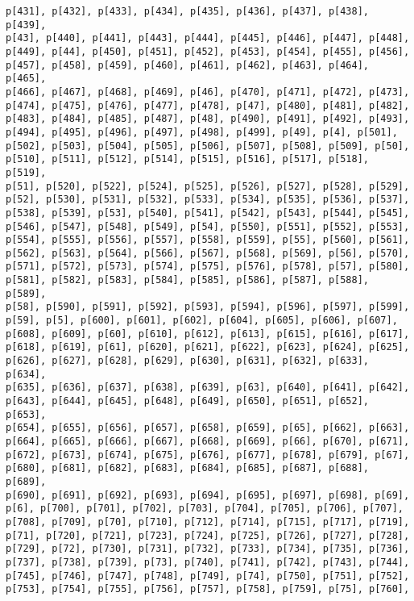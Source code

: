 \documentclass[
  letterpaper,
  DIV=11,
  numbers=noendperiod]{scrartcl}
\begin{document}
\begin{verbatim}
p[431], p[432], p[433], p[434], p[435], p[436], p[437], p[438], p[439],
p[43], p[440], p[441], p[443], p[444], p[445], p[446], p[447], p[448],
p[449], p[44], p[450], p[451], p[452], p[453], p[454], p[455], p[456],
p[457], p[458], p[459], p[460], p[461], p[462], p[463], p[464], p[465],
p[466], p[467], p[468], p[469], p[46], p[470], p[471], p[472], p[473],
p[474], p[475], p[476], p[477], p[478], p[47], p[480], p[481], p[482],
p[483], p[484], p[485], p[487], p[48], p[490], p[491], p[492], p[493],
p[494], p[495], p[496], p[497], p[498], p[499], p[49], p[4], p[501],
p[502], p[503], p[504], p[505], p[506], p[507], p[508], p[509], p[50],
p[510], p[511], p[512], p[514], p[515], p[516], p[517], p[518], p[519],
p[51], p[520], p[522], p[524], p[525], p[526], p[527], p[528], p[529],
p[52], p[530], p[531], p[532], p[533], p[534], p[535], p[536], p[537],
p[538], p[539], p[53], p[540], p[541], p[542], p[543], p[544], p[545],
p[546], p[547], p[548], p[549], p[54], p[550], p[551], p[552], p[553],
p[554], p[555], p[556], p[557], p[558], p[559], p[55], p[560], p[561],
p[562], p[563], p[564], p[566], p[567], p[568], p[569], p[56], p[570],
p[571], p[572], p[573], p[574], p[575], p[576], p[578], p[57], p[580],
p[581], p[582], p[583], p[584], p[585], p[586], p[587], p[588], p[589],
p[58], p[590], p[591], p[592], p[593], p[594], p[596], p[597], p[599],
p[59], p[5], p[600], p[601], p[602], p[604], p[605], p[606], p[607],
p[608], p[609], p[60], p[610], p[612], p[613], p[615], p[616], p[617],
p[618], p[619], p[61], p[620], p[621], p[622], p[623], p[624], p[625],
p[626], p[627], p[628], p[629], p[630], p[631], p[632], p[633], p[634],
p[635], p[636], p[637], p[638], p[639], p[63], p[640], p[641], p[642],
p[643], p[644], p[645], p[648], p[649], p[650], p[651], p[652], p[653],
p[654], p[655], p[656], p[657], p[658], p[659], p[65], p[662], p[663],
p[664], p[665], p[666], p[667], p[668], p[669], p[66], p[670], p[671],
p[672], p[673], p[674], p[675], p[676], p[677], p[678], p[679], p[67],
p[680], p[681], p[682], p[683], p[684], p[685], p[687], p[688], p[689],
p[690], p[691], p[692], p[693], p[694], p[695], p[697], p[698], p[69],
p[6], p[700], p[701], p[702], p[703], p[704], p[705], p[706], p[707],
p[708], p[709], p[70], p[710], p[712], p[714], p[715], p[717], p[719],
p[71], p[720], p[721], p[723], p[724], p[725], p[726], p[727], p[728],
p[729], p[72], p[730], p[731], p[732], p[733], p[734], p[735], p[736],
p[737], p[738], p[739], p[73], p[740], p[741], p[742], p[743], p[744],
p[745], p[746], p[747], p[748], p[749], p[74], p[750], p[751], p[752],
p[753], p[754], p[755], p[756], p[757], p[758], p[759], p[75], p[760],

\end{verbatim}
\end{document}
